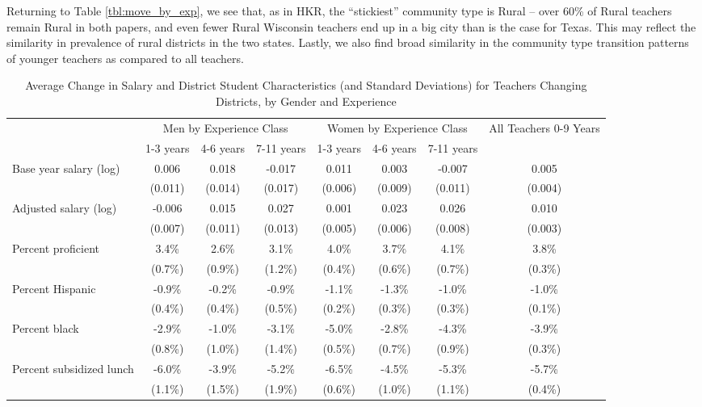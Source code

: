 \documentclass[]{article}
\begin{document}
Returning to Table \ref{tbl:move_by_exp}, we see that, as in HKR, the
``stickiest'' community type is Rural -- over 60\% of Rural teachers
remain Rural in both papers, and even fewer Rural Wisconsin teachers end
up in a big city than is the case for Texas. This may reflect the
similarity in prevalence of rural districts in the two states. Lastly,
we also find broad similarity in the community type transition patterns
of younger teachers as compared to all teachers.

\begin{sidewaystable}[htbp]
\centering
\begin{tabular}{lccccccc}
  \hline
 & \multicolumn{3}{c}{Men by Experience Class} & \multicolumn{3}{c}{Women by Experience Class} & \multirow{2}{*}{\parbox{0.09\linewidth}{All Teachers 0-9 Years}}\\ \cline{2-4} \cline{5-7}
 & 1-3 years & 4-6 years & 7-11 years & 1-3 years & 4-6 years & 7-11 years &  \\ 
  \hline
Base year salary (log) & 0.006 & 0.018 & -0.017 & 0.011 & 0.003 & -0.007 & 0.005 \\ 
   & (0.011) & (0.014) & (0.017) & (0.006) & (0.009) & (0.011) & (0.004) \\ 
  Adjusted salary (log) & -0.006 & 0.015 & 0.027 & 0.001 & 0.023 & 0.026 & 0.010 \\ 
   & (0.007) & (0.011) & (0.013) & (0.005) & (0.006) & (0.008) & (0.003) \\ 
  Percent proficient & 3.4\% & 2.6\% & 3.1\% & 4.0\% & 3.7\% & 4.1\% & 3.8\% \\ 
   & (0.7\%) & (0.9\%) & (1.2\%) & (0.4\%) & (0.6\%) & (0.7\%) & (0.3\%) \\ 
  Percent Hispanic & -0.9\% & -0.2\% & -0.9\% & -1.1\% & -1.3\% & -1.0\% & -1.0\% \\ 
   & (0.4\%) & (0.4\%) & (0.5\%) & (0.2\%) & (0.3\%) & (0.3\%) & (0.1\%) \\ 
  Percent black & -2.9\% & -1.0\% & -3.1\% & -5.0\% & -2.8\% & -4.3\% & -3.9\% \\ 
   & (0.8\%) & (1.0\%) & (1.4\%) & (0.5\%) & (0.7\%) & (0.9\%) & (0.3\%) \\ 
  Percent subsidized lunch & -6.0\% & -3.9\% & -5.2\% & -6.5\% & -4.5\% & -5.3\% & -5.7\% \\ 
   & (1.1\%) & (1.5\%) & (1.9\%) & (0.6\%) & (1.0\%) & (1.1\%) & (0.4\%) \\ 
   \hline
\end{tabular}
\caption{Average Change in Salary and District Student Characteristics (and Standard Deviations) for Teachers Changing Districts, by Gender and Experience} 
\label{tbl:change_by_ge}
\end{sidewaystable}
\end{document}
